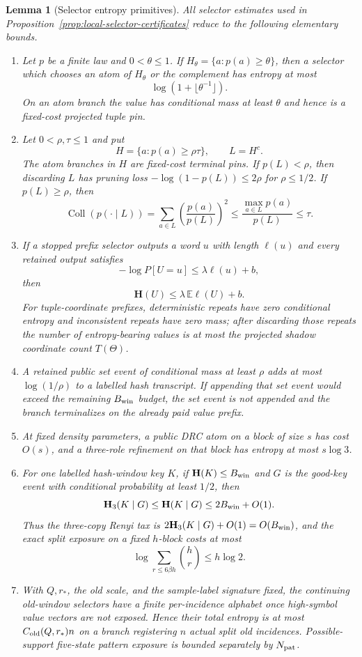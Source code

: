 \documentclass[11pt]{article}
\newtheorem{lemma}[theorem]{Lemma}
\newcommand{\EE}{\mathbb E}
\newcommand{\bfH}{\mathbf H}
\newcommand{\Coll}{\operatorname{Coll}}
\begin{document}
\begin{lemma}[Selector entropy primitives]
\label{lem:selector-primitives}
All selector estimates used in Proposition~\ref{prop:local-selector-certificates}
reduce to the following elementary bounds.
\begin{enumerate}[label=\textup{(\roman*)}]
\item Let $p$ be a finite law and $0<\theta\le1$.  If
$H_\theta=\{a:p(a)\ge\theta\}$, then a selector which chooses an atom of
$H_\theta$ or the complement has entropy at most
\[
  \log(1+\lfloor\theta^{-1}\rfloor).
\]
On an atom branch the value has conditional mass at least $\theta$ and hence
is a fixed-cost projected tuple pin.
\item Let $0<\rho,\tau\le1$ and put
\[
  H=\{a:p(a)\ge\rho\tau\},\qquad L=H^c .
\]
The atom branches in $H$ are fixed-cost terminal pins.  If $p(L)<\rho$, then
discarding $L$ has pruning loss $-\log(1-p(L))\le2\rho$ for
$\rho\le1/2$.  If $p(L)\ge\rho$, then
\[
  \Coll(p(\cdot\mid L))
  =
  \sum_{a\in L}\left(\frac{p(a)}{p(L)}\right)^2
  \le \frac{\max_{a\in L}p(a)}{p(L)}
  \le \tau .
\]
\item If a stopped prefix selector outputs a word $u$ with length $\ell(u)$
and every retained output satisfies
\[
  -\log P[U=u]\le \lambda\ell(u)+b,
\]
then
\[
  \bfH(U)\le \lambda\,\EE\ell(U)+b.
\]
For tuple-coordinate prefixes, deterministic repeats have zero conditional
entropy and inconsistent repeats have zero mass; after discarding those
repeats the number of entropy-bearing values is at most the projected shadow
coordinate count $T(\Theta)$.
\item A retained public set event of conditional mass at least $\rho$ adds at
most $\log(1/\rho)$ to a labelled hash transcript.  If appending that set
event would exceed the remaining $B_{\rm win}$ budget, the set event is not
appended and the branch terminalizes on the already paid value prefix.
\item At fixed density parameters, a public DRC atom on a block of size $s$
has cost $O(s)$, and a three-role refinement on that block has entropy at most
$s\log 3$.
\item For one labelled hash-window key $K$, if $\bfH(K)\le B_{\rm win}$ and
$G$ is the good-key event with conditional probability at least $1/2$, then
\[
  \bfH_3(K\mid G)\le \bfH(K\mid G)\le 2B_{\rm win}+O(1).
\]
Thus the three-copy Renyi tax is $2\bfH_3(K\mid G)+O(1)=O(B_{\rm win})$, and
the exact split exposure on a fixed $h$-block costs at most
\[
  \log\sum_{r\le6\beta h}\binom hr\le h\log 2.
\]
\item With $Q,r_*$, the old scale, and the sample-label signature fixed, the
continuing old-window selectors have a finite per-incidence alphabet once
high-symbol value vectors are not exposed.  Hence their total entropy is at
most $C_{\rm old}(Q,r_*)n$ on a branch registering $n$ actual split old
incidences.  Possible-support five-state pattern exposure is bounded
separately by $N_{\rm pat}$.
\end{enumerate}
\end{lemma}
\end{document}

